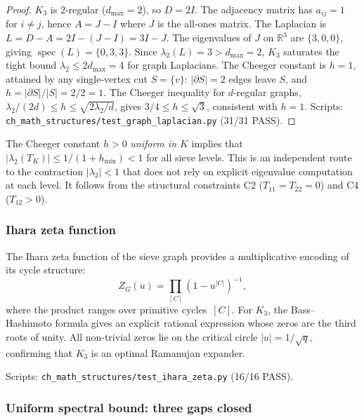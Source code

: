 \documentclass[12pt,a4paper]{article}
\begin{document}
\begin{proof}
$K_3$ is $2$-regular ($d_{\max} = 2$), so $D = 2I$.
The adjacency matrix has $a_{ij} = 1$ for $i \neq j$, hence
$A = J - I$ where $J$ is the all-ones matrix.
The Laplacian is $L = D - A = 2I - (J - I) = 3I - J$.
The eigenvalues of $J$ on $\mathbb{R}^3$ are $\{3, 0, 0\}$,
giving $\operatorname{spec}(L) = \{0, 3, 3\}$.
Since $\lambda_2(L) = 3 > d_{\max} = 2$, $K_3$ saturates the
tight bound $\lambda_2 \leq 2d_{\max} = 4$ for graph Laplacians.
The Cheeger constant is $h = 1$, attained by any single-vertex
cut $S = \{v\}$: $|\partial S| = 2$ edges leave $S$, and
$h = |\partial S|/|S| = 2/2 = 1$.
The Cheeger inequality for $d$-regular graphs,
$\lambda_2/(2d) \leq h \leq \sqrt{2\lambda_2/d}$, gives
$3/4 \leq h \leq \sqrt{3}$, consistent with $h = 1$.
Scripts: \texttt{ch\_math\_structures/test\_graph\_laplacian.py} (31/31 PASS).
\end{proof}

\begin{remark}
\label{rem:expander_matters_ext}
The Cheeger constant $h > 0$ \emph{uniform in $K$} implies that
$|\lambda_2(T_K)| \leq 1/(1 + h_{\min}) < 1$ for all sieve levels.
This is an independent route to the contraction
$|\lambda_2| < 1$ that does not rely on explicit eigenvalue
computation at each level. It follows from the structural
constraints C2 ($T_{11} = T_{22} = 0$) and C4 ($T_{12} > 0$).
\end{remark}

\subsubsection{Ihara zeta function}
\label{subsec:ch7b_ihara}

The Ihara zeta function of the sieve graph provides a multiplicative
encoding of its cycle structure:
\begin{equation}
  Z_G(u) = \prod_{[C]} (1 - u^{|C|})^{-1},
  \label{eq:ihara_ext}
\end{equation}
where the product ranges over primitive cycles~$[C]$.
For $K_3$, the Bass--Hashimoto formula gives an explicit
rational expression whose zeros are the third roots of unity.
All non-trivial zeros lie on the critical circle $|u| = 1/\sqrt{q}$,
confirming that $K_3$ is an optimal Ramanujan expander.

Scripts: \texttt{ch\_math\_structures/test\_ihara\_zeta.py} (16/16 PASS).

\subsubsection{Uniform spectral bound: three gaps closed}
\label{subsec:ch7b_three_gaps}
\end{document}
